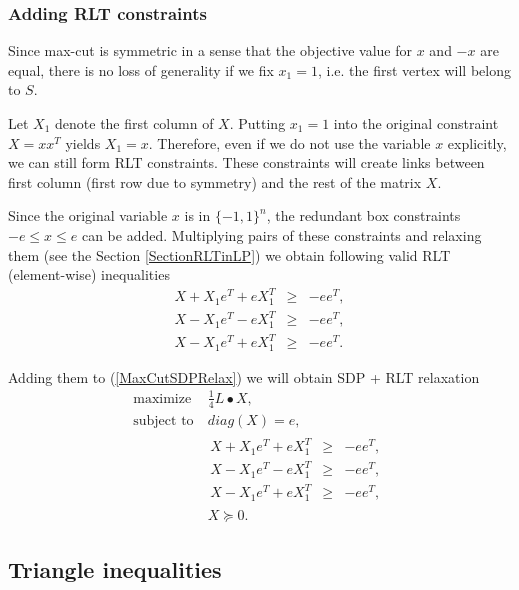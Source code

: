 \documentclass[12pt]{book}
\theoremstyle{definition}
\begin{document}
\subsubsection{Adding RLT constraints}
Since max-cut is symmetric in a sense that the objective value for $x$ and $-x$ are equal, there is no loss of generality if we fix $x_1 = 1$, i.e. the first vertex will belong to $S$. 

Let $X_1$ denote the first column of $X$. Putting $x_1 = 1$ into the original constraint $X = xx^T$ yields $X_1 = x$.
Therefore, even if we do not use the variable $x$ explicitly, we can still form RLT constraints. These constraints will create links between first column (first row due to symmetry) and the rest of the matrix $X$.

Since the original variable $x$ is in $\{-1,1\}^n$, the redundant box constraints $-e\leq x\leq e$ can be added. Multiplying pairs of these constraints and relaxing them (see the Section \ref{SectionRLTinLP}) we obtain following valid RLT (element-wise) inequalities
\begin{equation}
\label{MaxCutRLTInequalities}
\begin{array}{lcl}
		 X + X_1e^T + eX_1^T & \geq & -ee^T, \\
		 X - X_1e^T - eX_1^T & \geq & -ee^T, \\
		 X - X_1e^T + eX_1^T & \geq & -ee^T.
\end{array}
\end{equation}

Adding them to (\ref{MaxCutSDPRelax}) we will obtain SDP + RLT relaxation 
\begin{equation}
\label{MaxCutSDP+RLTRelax}
\begin{array}{ll}
\mbox{maximize} & \ \frac{1}{4}L\bullet X, \\
\mbox{subject to} & \ diag(X) = e , \\
& \begin{array}{lcl}
		 X + X_1e^T + eX_1^T & \geq & -ee^T, \\
		 X - X_1e^T - eX_1^T & \geq & -ee^T, \\
		 X - X_1e^T + eX_1^T & \geq & -ee^T,
\end{array} \\
&\	X\succeq 0.
\end{array}
\end{equation} 


\subsection{Triangle inequalities}
\label{SectionTriangle}
\end{document}
